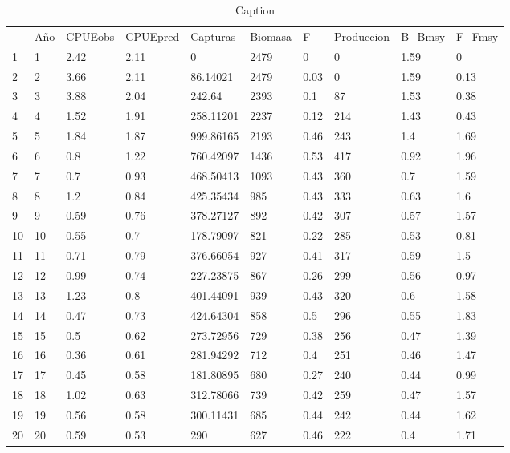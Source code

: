 \documentclass{uofa-eng-assignment}
\begin{document}
\begin{table}[H]
 \caption{Caption}
\begin{tabular}{llllllllll}
   & Año & CPUEobs & CPUEpred & Capturas  & Biomasa & F    & Produccion & B\_Bmsy & F\_Fmsy \\
1  & 1   & 2.42    & 2.11     & 0         & 2479    & 0    & 0          & 1.59    & 0       \\
2  & 2   & 3.66    & 2.11     & 86.14021  & 2479    & 0.03 & 0          & 1.59    & 0.13    \\
3  & 3   & 3.88    & 2.04     & 242.64    & 2393    & 0.1  & 87         & 1.53    & 0.38    \\
4  & 4   & 1.52    & 1.91     & 258.11201 & 2237    & 0.12 & 214        & 1.43    & 0.43    \\
5  & 5   & 1.84    & 1.87     & 999.86165 & 2193    & 0.46 & 243        & 1.4     & 1.69    \\
6  & 6   & 0.8     & 1.22     & 760.42097 & 1436    & 0.53 & 417        & 0.92    & 1.96    \\
7  & 7   & 0.7     & 0.93     & 468.50413 & 1093    & 0.43 & 360        & 0.7     & 1.59    \\
8  & 8   & 1.2     & 0.84     & 425.35434 & 985     & 0.43 & 333        & 0.63    & 1.6     \\
9  & 9   & 0.59    & 0.76     & 378.27127 & 892     & 0.42 & 307        & 0.57    & 1.57    \\
10 & 10  & 0.55    & 0.7      & 178.79097 & 821     & 0.22 & 285        & 0.53    & 0.81    \\
11 & 11  & 0.71    & 0.79     & 376.66054 & 927     & 0.41 & 317        & 0.59    & 1.5     \\
12 & 12  & 0.99    & 0.74     & 227.23875 & 867     & 0.26 & 299        & 0.56    & 0.97    \\
13 & 13  & 1.23    & 0.8      & 401.44091 & 939     & 0.43 & 320        & 0.6     & 1.58    \\
14 & 14  & 0.47    & 0.73     & 424.64304 & 858     & 0.5  & 296        & 0.55    & 1.83    \\
15 & 15  & 0.5     & 0.62     & 273.72956 & 729     & 0.38 & 256        & 0.47    & 1.39    \\
16 & 16  & 0.36    & 0.61     & 281.94292 & 712     & 0.4  & 251        & 0.46    & 1.47    \\
17 & 17  & 0.45    & 0.58     & 181.80895 & 680     & 0.27 & 240        & 0.44    & 0.99    \\
18 & 18  & 1.02    & 0.63     & 312.78066 & 739     & 0.42 & 259        & 0.47    & 1.57    \\
19 & 19  & 0.56    & 0.58     & 300.11431 & 685     & 0.44 & 242        & 0.44    & 1.62    \\
20 & 20  & 0.59    & 0.53     & 290       & 627     & 0.46 & 222        & 0.4     & 1.71   
\end{tabular}
\end{table}
\end{document}
